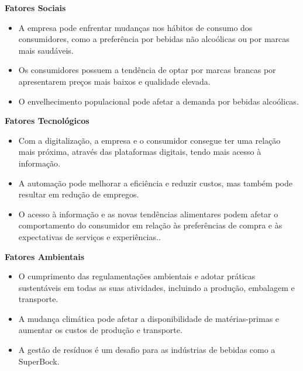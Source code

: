 \noindent \textbf{Fatores Sociais} %
\begin{itemize}
    \item A empresa pode enfrentar mudanças nos hábitos de consumo dos consumidores, como a preferência por bebidas não alcoólicas ou por marcas mais saudáveis.
    \item Os consumidores possuem a tendência de optar por marcas brancas por apresentarem preços mais baixos e qualidade elevada\cite{ref7}.
    \item O envelhecimento populacional pode afetar a demanda por bebidas alcoólicas.
\end{itemize}

\newpage
\noindent \textbf{Fatores Tecnológicos} %
\begin{itemize}
    \item Com a digitalização, a empresa e o consumidor consegue ter uma relação mais próxima, através das plataformas digitais, tendo mais acesso à informação\cite{ref7}.
    \item A automação pode melhorar a eficiência e reduzir custos, mas também pode resultar em redução de empregos.
    \item O acesso à informação e as novas tendências alimentares podem afetar o comportamento do consumidor em relação às preferências de compra e às expectativas de serviços e experiências..
\end{itemize}


\noindent \textbf{Fatores Ambientais} %
\begin{itemize}
    \item O cumprimento das regulamentações ambientais e adotar práticas sustentáveis em todas as suas atividades, incluindo a produção, embalagem e transporte\cite{ref7}.
    \item A mudança climática pode afetar a disponibilidade de matérias-primas e aumentar os custos de produção e transporte.
    \item A gestão de resíduos é um desafio para as indústrias de bebidas como a SuperBock.
\end{itemize}

